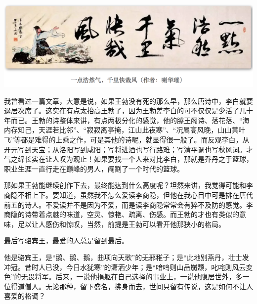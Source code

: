 \documentclass[
]{book}
\begin{document}
\includegraphics[width=8.33in]{images/ctsj6}

我曾看过一篇文章，大意是说，如果王勃没有死的那么早，那么唐诗中，李白就要退居次席了。这实在有点太抬高王勃了，因为王勃差李白的可不仅仅是少活了几十年而已。王勃的诗整体来讲，有点两极分化的感觉，他的滕王阁诗、落花落、``海内存知己，天涯若比邻''、``寂寂离亭掩，江山此夜寒''、``况属高风晚，山山黄叶飞''等都是难得的上乘之作，可是其他的诗呢，就显得很一般了。而反观李白，从开元写到天宝；从洛阳写到咸阳；写将进酒也写行路难；写清平调也写秋风词。才气之绵长实在让人叹为观止！如果要找一个人来对比李白，那就是乔丹之于篮球，职业生涯一直行走在巅峰的男人，阉割了一个时代的篮球。

那如果王勃能继续创作下去，最终能达到什么高度呢？坦然来讲，我觉得可能和李商隐不相上下。要知道，虽然我不怎么爱读李商隐，但他在我心目中可是排在唐代前五的诗人。不爱读并不是因为不爱，而是读李商隐常常会有猝不及防的感觉。李商隐的诗带着点魅的味道，空灵、惊艳、疏离、伤感。而王勃的才也有类似的意味，足以让人感伤和惊叹，当然，前提是王勃可以看开他那狭小的格局。

最后写骆宾王，最爱的人总是留到最后。

他是骆宾王，是``鹅、鹅、鹅，曲项向天歌''的无邪稚子；是``此地别燕丹，壮士发冲冠。昔时人已没，今日水犹寒''的潇洒少年；是``喑呜则山岳崩颓，叱咤则风云变色''的无畏将军。后来，一说他捐躯在自己选择的事业上，一说他隐居世外，多一位得道僧人。无论那种，留下盛名，拂身而去，世间只留有传说，这是如何不让人喜爱的格调？
\end{document}
